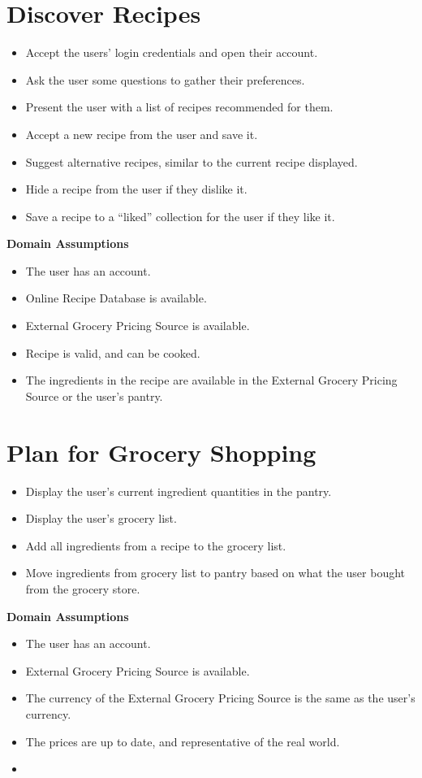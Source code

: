 \documentclass[11pt, letterpaper]{report}
\begin{document}
\section{Discover Recipes}
\begin{itemize}
    \item Accept the users’ login credentials and open their account.
    \item Ask the user some questions to gather their preferences.
    \item Present the user with a list of recipes recommended for them.
    \item Accept a new recipe from the user and save it.
    \item Suggest alternative recipes, similar to the current recipe displayed.
    \item Hide a recipe from the user if they dislike it.
    \item Save a recipe to a “liked” collection for the user if they like it.
\end{itemize}
\textbf{Domain Assumptions}
\begin{itemize}
    \item The user has an account.
    \item Online Recipe Database is available.
    \item External Grocery Pricing Source is available.
    \item Recipe is valid, and can be cooked.
    \item The ingredients in the recipe are available in the External Grocery Pricing Source or the user’s pantry.
\end{itemize}

\section{Plan for Grocery Shopping}
\begin{itemize}
    \item Display the user’s current ingredient quantities in the pantry.
    \item Display the user’s grocery list.
    \item Add all ingredients from a recipe to the grocery list.
    \item Move ingredients from grocery list to pantry based on what the user bought from the grocery store.
\end{itemize}
\textbf{Domain Assumptions}
\begin{itemize}
    \item The user has an account.
    \item External Grocery Pricing Source is available.
    \item The currency of the External Grocery Pricing Source is the same as the user’s currency.
    \item The prices are up to date, and representative of the real world.
    \item 
\end{itemize}
\end{document}
